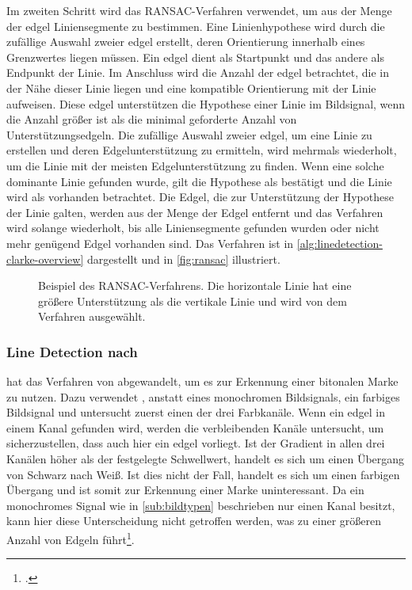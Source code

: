 Im zweiten Schritt wird das RANSAC-Verfahren verwendet, um aus der Menge der \gls{edgel} Liniensegmente zu bestimmen.
 Eine Linienhypothese wird durch die zufällige Auswahl zweier \gls{edgel} erstellt, deren Orientierung innerhalb
 eines Grenzwertes liegen müssen. Ein \gls{edgel} dient als Startpunkt und das andere als Endpunkt der Linie. Im
 Anschluss wird die Anzahl der \gls{edgel} betrachtet, die in der Nähe dieser Linie liegen und eine kompatible
 Orientierung mit der Linie aufweisen. Diese \gls{edgel} unterstützen die Hypothese einer Linie im Bildsignal, wenn
 die Anzahl größer ist als die minimal geforderte Anzahl von Unterstützungsedgeln. Die zufällige Auswahl zweier
 \gls{edgel}, um eine Linie zu erstellen und deren Edgelunterstützung zu ermitteln, wird mehrmals wiederholt, um die
 Linie mit der meisten Edgelunterstützung zu finden. Wenn eine solche dominante Linie gefunden wurde, gilt die
 Hypothese als bestätigt und die Linie wird als vorhanden betrachtet. Die Edgel, die zur Unterstützung der Hypothese
 der Linie galten, werden aus der Menge der Edgel entfernt und das Verfahren wird solange wiederholt, bis alle
 Liniensegmente gefunden wurden oder nicht mehr genügend Edgel vorhanden sind. Das Verfahren ist in
 \autoref{alg:linedetection-clarke-overview} dargestellt und in \autoref{fig:ransac} illustriert.

\begin{figure}[!ht]
	\centering
	
	\caption{Beispiel des RANSAC-Verfahrens. Die horizontale Linie hat eine größere Unterstützung als die vertikale
	 Linie und wird von dem Verfahren ausgewählt.}
	\label{fig:ransac}
\end{figure}

\subsubsection{Line Detection nach \texorpdfstring{\citeauthor{hirzer08}}{Hirzer}} %
\label{sub:line_detection_hirzer}

\citeauthor{hirzer08} hat das Verfahren von \citeauthor{clarke96} abgewandelt, um es zur Erkennung einer bitonalen
 Marke zu nutzen. Dazu verwendet \citeauthor{hirzer08}, anstatt eines monochromen Bildsignals, ein farbiges Bildsignal
 und untersucht zuerst einen der drei Farbkanäle. Wenn ein \gls{edgel} in einem Kanal gefunden wird, werden die
 verbleibenden Kanäle untersucht, um sicherzustellen, dass auch hier ein \gls{edgel} vorliegt. Ist der Gradient in
 allen drei Kanälen höher als der festgelegte Schwellwert, handelt es sich um einen Übergang  von Schwarz nach Weiß.
 Ist dies nicht der Fall, handelt es sich um einen farbigen Übergang und ist somit zur Erkennung einer Marke
 uninteressant. Da ein monochromes Signal wie in \autoref{sub:bildtypen} beschrieben nur einen Kanal besitzt, kann hier
 diese Unterscheidung nicht getroffen werden, was zu einer größeren Anzahl von Edgeln
 führt\footcite[Vgl.][S.~6--7]{hirzer08}.

